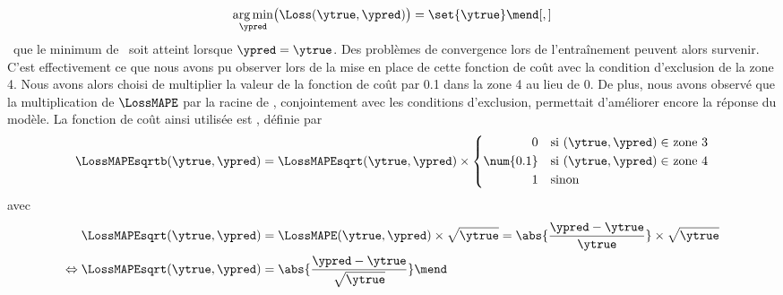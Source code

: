 \begin{equation}
\underset{\ypred}{\mathrm{arg\,min}} \big( \Loss(\ytrue, \ypred) \big) = \set{\ytrue}
\mend[,]
\end{equation}
\ie\ que le minimum de \Loss\ soit atteint lorsque $\ypred=\ytrue$.
Des problèmes de convergence lors de l'entraînement peuvent alors survenir.
C'est effectivement ce que nous avons pu observer lors de la mise en place de cette fonction de coût
avec la condition d'exclusion de la zone 4.
Nous avons alors choisi de multiplier la valeur de la fonction de coût par \num{0.1} dans la zone 4 au lieu de 0.
De plus, nous avons observé que la multiplication de $\LossMAPE$ par la racine de \ytrue,
conjointement avec les conditions d'exclusion,
permettait d'améliorer encore la réponse du modèle.
La fonction de coût ainsi utilisée est
\LossMAPEsqrtb, définie par
\begin{equation}
\LossMAPEsqrtb(\ytrue, \ypred)
=
\LossMAPEsqrt(\ytrue, \ypred)
\times
\left\lbrace
\begin{aligned}
0 \quad & \text{si $(\ytrue, \ypred)\in$ zone 3}\\
\num{0.1} \quad & \text{si $(\ytrue, \ypred)\in$ zone 4}\\
1 \quad & \text{sinon}
\end{aligned}
\right.
\label{eq-LossMAPEsqrtb}
\end{equation}
avec
\begin{align}
\LossMAPEsqrt(\ytrue, \ypred)
&=
\LossMAPE(\ytrue, \ypred) \times \sqrt{\ytrue}
=
\abs{\frac{\ypred-\ytrue}{\ytrue}} \times \sqrt{\ytrue}
\nonumber\\\Leftrightarrow
\LossMAPEsqrt(\ytrue, \ypred)
&=
\abs{\frac{\ypred-\ytrue}{\sqrt{\ytrue}}}
\mend
\end{align}
